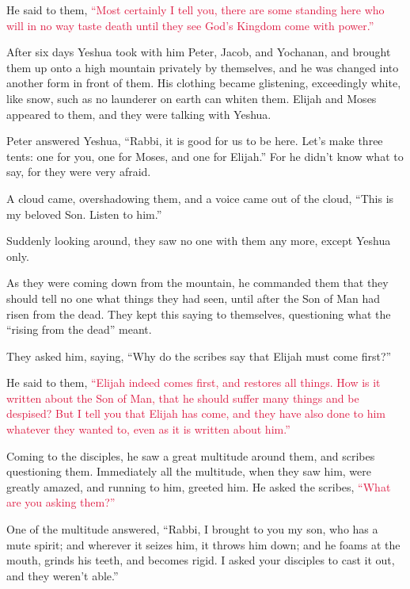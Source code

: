 \mychapter{} \myverse*{}He said to them,
\textcolor{crimson}{“Most certainly I tell you, there are some standing here who will in no way taste death until they
	see God’s Kingdom come with power.”}

\myverse{}After six days Yeshua took with him Peter, Jacob, and Yochanan,
and brought them up onto a high mountain privately by themselves, and he was changed into another form
in front of them.
\myverse{}His clothing became glistening, exceedingly white, like snow, such as no launderer
on earth can whiten them.
\myverse{}Elijah and Moses appeared to them, and they were talking with Yeshua.

\myverse{}Peter answered Yeshua, “Rabbi, it is good for us to be here. Let’s
make three tents: one for you, one for Moses, and one for Elijah.”
\myverse{}For he didn’t know what to say, for they were very afraid.

\myverse{}A cloud came, overshadowing them, and a voice came out of the cloud,
“This is my beloved Son. Listen to him.”

\myverse{}Suddenly looking around, they saw no one with them any more, except
Yeshua only.

\myverse{}As they were coming down from the mountain, he commanded them that
they should tell no one what things they had seen, until after the Son of Man had risen from the dead.
\myverse{}They kept this saying to themselves, questioning what the “rising from the
dead” meant.

\myverse{}They asked him, saying, “Why do the scribes say that Elijah must
come first?”

\myverse{}He said to them,
\textcolor{crimson}{“Elijah indeed comes first, and restores all things. How is it written about the Son of Man, that
	he should suffer many things and be despised?
}
\myverse{}\textcolor{crimson}{But I tell you that Elijah has come, and they have also done to him whatever
	they wanted to, even as it is written about him.”}

\myverse{}Coming to the disciples, he saw a great multitude around them,
and scribes questioning them.
\myverse{}Immediately all the multitude, when they saw him, were greatly amazed, and
running to him, greeted him.
\myverse{}He asked the scribes,
\textcolor{crimson}{“What are you asking them?”}

\myverse{}One of the multitude answered, “Rabbi, I brought to you my son,
who has a mute spirit;
\myverse{}and wherever it seizes him, it throws him down; and he foams at the mouth,
grinds his teeth, and becomes rigid. I asked your disciples to cast it out, and they weren’t able.”

